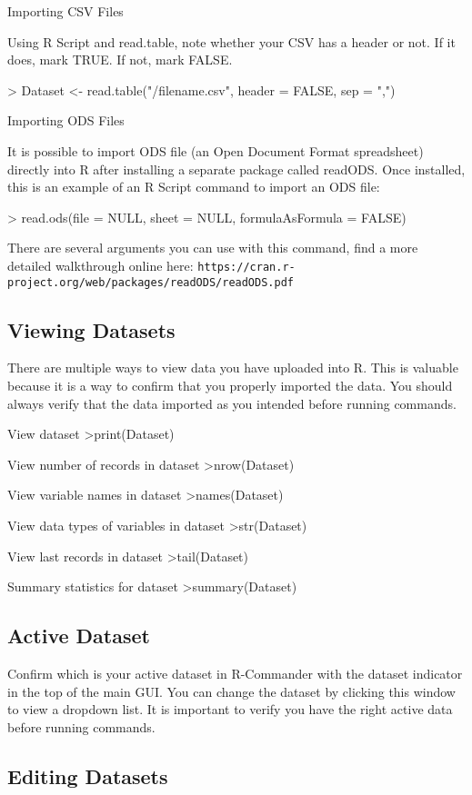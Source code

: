 Importing CSV Files

Using R Script and read.table, note whether your CSV has a header or not. If it does, mark TRUE. If not, mark FALSE.

> Dataset <-  read.table("/filename.csv", header = FALSE, sep = ",")

Importing ODS Files

It is possible to import ODS file (an Open Document Format spreadsheet) directly into R after installing a separate package called readODS. Once installed, this is an example of an R Script command to import an ODS file:

> read.ods(file = NULL, sheet = NULL, formulaAsFormula = FALSE)

There are several arguments you can use with this command, find a more detailed walkthrough online here: \texttt{https://cran.r-project.org/web/packages/readODS/readODS.pdf}

\subsection{Viewing Datasets}
There are multiple ways to view data you have uploaded into R. This is valuable because it is a way to confirm that you properly imported the data. You should always verify that the data imported as you intended before running commands.

View dataset
>print(Dataset)

View number of records in dataset
>nrow(Dataset)

View variable names in dataset
>names(Dataset)

View data types of variables in dataset
>str(Dataset)

View last records in dataset
>tail(Dataset)

Summary statistics for dataset
>summary(Dataset)

\subsection{Active Dataset}
Confirm which is your active dataset in R-Commander with the dataset indicator in the top of the main GUI. You can change the dataset by clicking this window to view a dropdown list. It is important to verify you have the right active data before running commands.

\subsection{Editing Datasets}